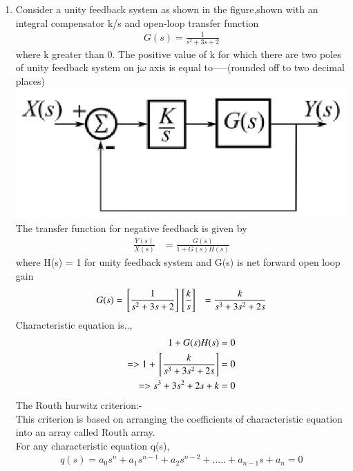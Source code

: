 \begin{enumerate}[label=\thesection.\arabic*.,ref=\thesection.\theenumi]
\item
Consider a unity feedback system as shown in the figure,shown with an integral compensator k/s and open-loop transfer function
\begin{align}
G(s) = \frac{1}{s^2+3s+2}
\end{align}
where k greater than 0. The positive value of k for which there are two poles of unity feedback system on j${\omega}$ axis is equal to-----(rounded off to two decimal places)
\centering
\includegraphics[width=\columnwidth]{./figs/ee18btech11005.eps}
\\
\solution The transfer function for negative feedback is given by
\begin{align}
\frac{Y(s)}{X(s)} &= \frac{G(s)}{1+G(s)H(s)}
\end{align}
where H(s) = 1 for unity feedback system
and G(s) is net forward open loop gain
\\
\begin{align}
G(s) &=  {}\left[\frac{1}{s^2+3s+2}\right]{}\left[\frac{k}{s}\right]
&= \frac{k}{s^3+3s^2+2s}
\end{align}
Characteristic equation is..,
\\
\begin{align}
 1 + G(s)H(s) = 0 \label{eq:sec_order_op}
\\
=> 1 + {}\left[\frac{k}{s^3+3s^2+2s}\right] = 0
\\
=> s^3+3s^2+2s+k = 0
\end{align}
The Routh hurwitz criterion:-
\\
This criterion is based on arranging the coefficients of characteristic equation into an array called Routh array.
\\
For any characteristic equation q(s),
\\
\begin{align}
q(s) = a_0s^n+a_1s^{n-1}+a_2s^{n-2}+.....+a_{n-1}s+a_n = 0
\end{align}

\end{enumerate}

